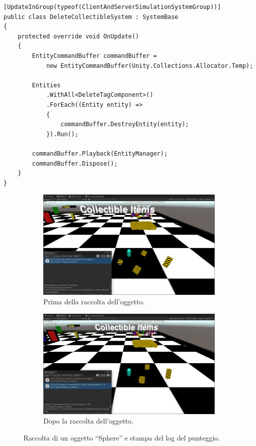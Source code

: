 \begin{lstlisting}[caption={File \UseVerb{DeleteCollectibleSystemTerm}: eliminazione delle entità aventi il componente \UseVerb{DeleteTagComponentTerm}.}, label={lst:prototipo-delete-system}, language={[Sharp]C}]
[UpdateInGroup(typeof(ClientAndServerSimulationSystemGroup))]
public class DeleteCollectibleSystem : SystemBase
{
    protected override void OnUpdate()
    {
        EntityCommandBuffer commandBuffer =
            new EntityCommandBuffer(Unity.Collections.Allocator.Temp);

        Entities
            .WithAll<DeleteTagComponent>()
            .ForEach((Entity entity) =>
            {
                commandBuffer.DestroyEntity(entity);
            }).Run();

        commandBuffer.Playback(EntityManager);
        commandBuffer.Dispose();
    }
}
\end{lstlisting}

\begin{figure}[!ht]
    \begin{subfigure}{.49\textwidth}
      \centering
      \includegraphics[width=.95\linewidth]{gfx/imgs/chapter4/PickUpCollectible1.png}
      \caption{Prima della raccolta dell'oggetto.}
      \label{fig:pickup-1}
    \end{subfigure}
    \begin{subfigure}{.49\textwidth}
      \centering
      \includegraphics[width=.95\linewidth]{gfx/imgs/chapter4/PickUpCollectible2.png}
      \caption{Dopo la raccolta dell'oggetto.}
      \label{fig:pickup-2}
    \end{subfigure}
    \caption{Raccolta di un oggetto ``Sphere'' e stampa del log del punteggio.}
    \label{fig:pickup-collectibles}
\end{figure}

